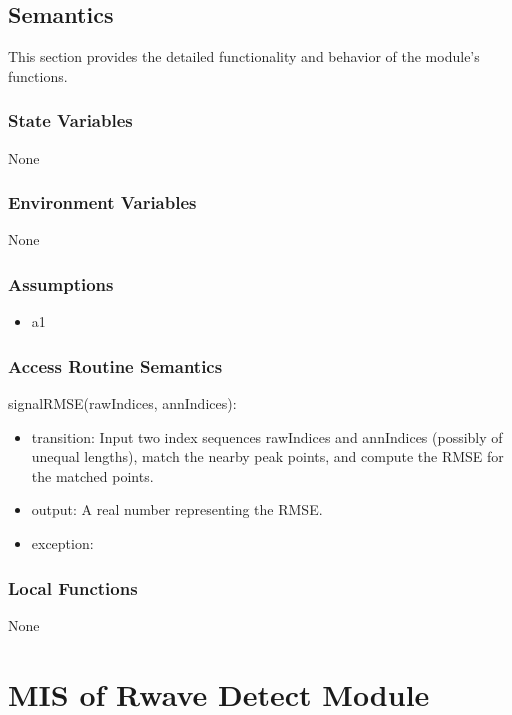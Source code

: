 \documentclass[12pt, titlepage]{article}
\begin{document}
\subsection{Semantics}

This section provides the detailed functionality and behavior of the module’s
functions.

\subsubsection{State Variables}

None

\subsubsection{Environment Variables}

None

\subsubsection{Assumptions}

\begin{itemize}
\item a1
\end{itemize}

\subsubsection{Access Routine Semantics}

\noindent signalRMSE(rawIndices, annIndices):
\begin{itemize}
\item transition: Input two index sequences rawIndices and annIndices (possibly
of unequal lengths), match the nearby peak points, and compute the RMSE for the
matched points.
\item output: A real number representing the RMSE.
\item exception: 
\end{itemize}

\subsubsection{Local Functions}

None

\newpage

\section{MIS of Rwave Detect Module} \label{MIS_Rwave}
\end{document}
